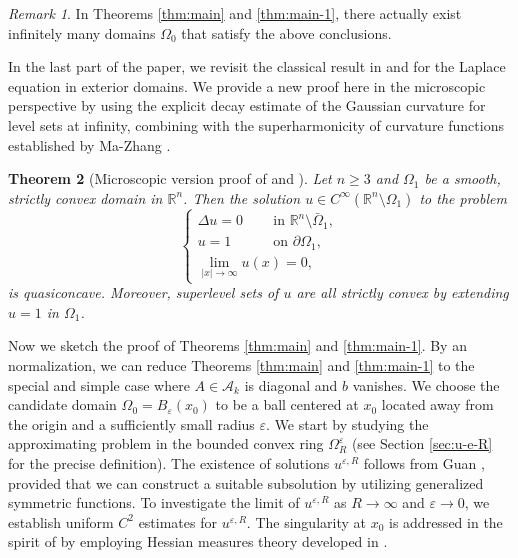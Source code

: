 \documentclass[reqno]{amsart}
\newtheorem{theorem}{Theorem}[section]
\theoremstyle{remark}
\newtheorem{remark}[theorem]{Remark}
\theoremstyle{definition}
\numberwithin{equation}{section}
\begin{document}
\begin{remark}\label{rmk}
	In Theorems \ref{thm:main} and \ref{thm:main-1}, there actually exist infinitely many domains $\Omega_0$ that satisfy the above conclusions.
\end{remark}

In the last part of the paper, we revisit the classical result in \cite{Lewis-1977} and \cite{Kawohl-1985} for the Laplace equation in exterior domains. We provide a new proof here in the microscopic perspective by using the explicit decay estimate of the Gaussian curvature for level sets at infinity, combining with the superharmonicity of curvature functions established by Ma-Zhang \cite{Ma-Zhang-2021}.   

\begin{theorem}[Microscopic version proof of \cite{Lewis-1977} and \cite{Kawohl-1985}]\label{thm:main-H}
	Let $n\geq3$ and $\Omega_1$ be a smooth, strictly convex domain in $\mathbb{R}^n$. Then the solution $u\in C^\infty(\mathbb{R}^n\setminus\Omega_1)$ to the problem
	\begin{equation}\label{eq:H-EDP}
		\begin{cases}
			\Delta u=0 \,\qquad \text{in }\mathbb{R}^n\setminus\bar{\Omega}_1, \\
			u=1 \quad\quad\quad \text{on }\partial\Omega_1, \\
			\lim\limits_{|x|\to\infty} u(x)=0,
		\end{cases}	
	\end{equation}
	is quasiconcave. Moreover, superlevel sets of $u$ are all strictly convex by extending $u = 1$ in $\Omega_1$.
\end{theorem}

Now we sketch the proof of Theorems \ref{thm:main} and \ref{thm:main-1}. By an normalization, we can reduce Theorems \ref{thm:main} and \ref{thm:main-1} to the special and simple case where $A\in\mathcal{A}_k$ is diagonal and $b$ vanishes. We choose the candidate domain $\Omega_0=B_\varepsilon(x_0)$ to be a ball centered at $x_0$ located away from the origin and a sufficiently small radius $\varepsilon$. We start by studying the approximating problem in the bounded convex ring $\Omega_R^\varepsilon$ (see Section \ref{sec:u-e-R} for the precise definition). The existence of solutions $u^{\varepsilon,R}$ follows from Guan \cite{Guan-Duke}, provided that we can construct a suitable subsolution by utilizing generalized symmetric functions. To investigate the limit of $u^{\varepsilon,R}$ as $R\to\infty$ and $\varepsilon\to 0$, we establish uniform $C^2$ estimates for $u^{\varepsilon,R}$. The singularity at $x_0$ is addressed in the spirit of \cite{Wang-Xiao} by employing Hessian measures theory developed in \cite{Trudinger-Wang-II}.
\end{document}
